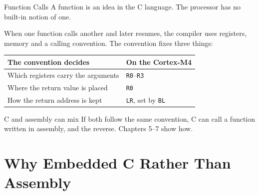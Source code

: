 \documentclass[9pt,aspectratio=169,xcolor=table]{beamer}
\begin{document}
\begin{frame}{Function Calls}
    \leavevmode
    A \alert{function} is an idea in the C language. The processor has no built-in notion of one.

    \vspace{3mm}
    When one function calls another and later resumes, the compiler uses registers, memory and a \alert{calling convention}. The convention fixes three things:

    \vspace{1mm}
    \begin{center}
    {\small
    \striped
    \begin{tabular}{@{}l l@{}}
        \toprule
        \textbf{The convention decides} & \textbf{On the Cortex-M4} \\
        \midrule
        Which registers carry the arguments & \texttt{R0}--\texttt{R3} \\
        Where the return value is placed & \texttt{R0} \\
        How the return address is kept & \texttt{LR}, set by \texttt{BL} \\
        \bottomrule
    \end{tabular}}
    \end{center}

    \vspace{2mm}
    \begin{block}{C and assembly can mix}
        If both follow the same convention, C can call a function written in assembly, and the reverse. Chapters 5--7 show how.
    \end{block}
\end{frame}


\section{Why Embedded C Rather Than Assembly}
\end{document}
